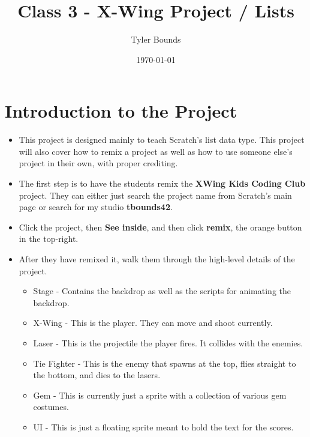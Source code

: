 \documentclass[12pt]{article}
\title{Class 3 - X-Wing Project / Lists}
\author{Tyler Bounds}
\date{\today}
\begin{document}
\maketitle


\section *{Introduction to the Project}
	\begin{itemize}
		\item This project is designed mainly to teach Scratch's list data type. This project will also cover how to remix a project as well as how to use someone else's project in their own, with proper crediting. 

		\item The first step is to have the students remix the \textbf{XWing Kids Coding Club} project. They can either just search the project name from Scratch's main page or search for my studio \textbf{tbounds42}. 

		\item Click the project, then \textbf{See inside}, and then click \textbf{remix}, the orange button in the top-right. 

		\item After they have remixed it, walk them through the high-level details of the project. 

		\begin{itemize}
    		\item{Stage - Contains the backdrop as well as the scripts for animating the backdrop.}
    		\item{X-Wing - This is the player. They can move and shoot currently.}
    		\item{Laser - This is the projectile the player fires. It collides with the enemies.}
    		\item{Tie Fighter - This is the enemy that spawns at the top, flies straight to the bottom, and dies to the lasers.}
    		\item{Gem - This is currently just a sprite with a collection of various gem costumes.}
    		\item{UI - This is just a floating sprite meant to hold the text for the scores.}
		\end{itemize}
	
	\end{itemize}
\end{document}
